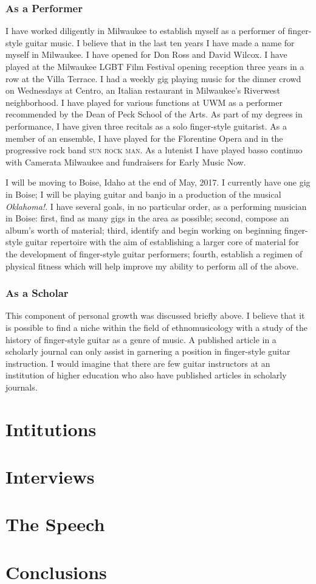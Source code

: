 \documentclass[12pt]{article}
\begin{document}
\subsubsection{As a Performer}
\label{sec:performer}
I have worked diligently in Milwaukee to establish myself as a
performer of finger-style guitar music. I believe that in the last ten
years I have made a name for myself in Milwaukee. I have opened for
Don Ross and David Wilcox. I have played at the Milwaukee LGBT Film
Festival opening reception three years in a row at the Villa
Terrace. I had a weekly gig playing music for the dinner crowd on
Wednesdays at Centro, an Italian restaurant in Milwaukee's Riverwest
neighborhood. I have played for various functions at UWM as a
performer recommended by the Dean of Peck School of the Arts. As part
of my degrees in performance, I have given three recitals as a solo
finger-style guitarist. As a member of an ensemble, I have played for
the Florentine Opera and in the progressive rock band \textsc{sun rock
  man}. As a lutenist I have played basso continuo with Camerata
Milwaukee and fundraisers for Early Music Now.

I will be moving to Boise, Idaho at the end of May, 2017. I currently
have one gig in Boise; I will be playing guitar and banjo in a
production of the musical \emph{Oklahoma!}. I have several goals, in
no particular order, as a performing musician in Boise: first, find as
many gigs in the area as possible; second, compose an album's worth of
material; third, identify and begin working on beginning finger-style
guitar repertoire with the aim of establishing a larger core of
material for the development of finger-style guitar performers;
fourth, establish a regimen of physical fitness which will help
improve my ability to perform all of the above.

\subsubsection{As a Scholar}
\label{sec:scholar}
This component of personal growth was discussed briefly above. I
believe that it is possible to find a niche within the field of
ethnomusicology with a study of the history of finger-style guitar as
a genre of music. A published article in a scholarly journal can only
assist in garnering a position in finger-style guitar instruction. I
would imagine that there are few guitar instructors at an institution
of higher education who also have published articles in scholarly
journals. 
\section{Intitutions}
\label{sec:intitutions}

\section{Interviews}
\label{sec:interviews}

\section{The Speech}
\label{sec:speech}

\section{Conclusions}
\label{sec:conclusions}

\clearpage
\printbibliography
\end{document}
